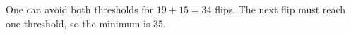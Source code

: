 One can avoid both thresholds for $19+15=34$ flips. The next flip must reach one threshold, so the minimum is $\boxed{35}$.
